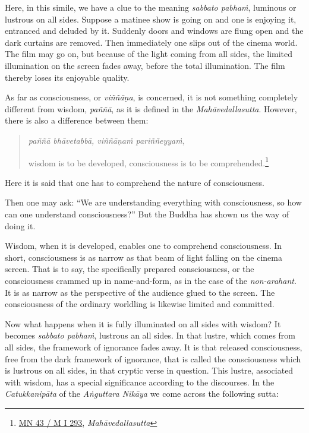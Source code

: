 Here, in this simile, we have a clue to the meaning \emph{sabbato pabhaṁ}, luminous or lustrous on all sides. Suppose a matinee show is going on and one is enjoying it, entranced and deluded by it. Suddenly doors and windows are flung open and the dark curtains are removed. Then immediately one slips out of the cinema world. The film may go on, but because of the light coming from all sides, the limited illumination on the screen fades away, before the total illumination. The film thereby loses its enjoyable quality.

As far as consciousness, or \emph{viññāṇa}, is concerned, it is not something completely different from wisdom, \emph{paññā}, as it is defined in the \emph{Mahāvedallasutta}. However, there is also a difference between them:

\begin{quote}
\emph{paññā bhāvetabbā, viññāṇaṁ pariññeyyaṁ,}

wisdom is to be developed, consciousness is to be comprehended.\footnote{\href{https://suttacentral.net/mn43/pli/ms}{MN 43 / M I 293}, \emph{Mahāvedallasutta}}
\end{quote}

Here it is said that one has to comprehend the nature of consciousness.

Then one may ask: ``We are understanding everything with consciousness, so how can one understand consciousness?'' But the Buddha has shown us the way of doing it.

Wisdom, when it is developed, enables one to comprehend consciousness. In short, consciousness is as narrow as that beam of light falling on the cinema screen. That is to say, the specifically prepared consciousness, or the consciousness crammed up in name-and-form, as in the case of the \emph{non-arahant}. It is as narrow as the perspective of the audience glued to the screen. The consciousness of the ordinary worldling is likewise limited and committed.

Now what happens when it is fully illuminated on all sides with wisdom? It becomes \emph{sabbato pabhaṁ}, lustrous an all sides. In that lustre, which comes from all sides, the framework of ignorance fades away. It is that released consciousness, free from the dark framework of ignorance, that is called the consciousness which is lustrous on all sides, in that cryptic verse in question. This lustre, associated with wisdom, has a special significance according to the discourses. In the \emph{Catukkanipāta} of the \emph{Aṅguttara Nikāya} we come across the following sutta:

